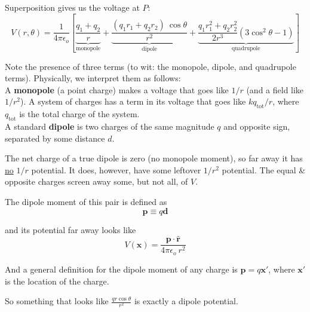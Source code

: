 \documentclass{article}
\numberwithin{equation}{section}
\newcommand{\rhat}{\mathbf{\hat{r}}}
\begin{document}
Superposition gives us the voltage at $P$:
\begin{equation*}
    V(r,\theta) = \frac{1}{4\pi\epsilon_o} \left[ \underbrace{\frac{q_1 + q_2}{r}}_{\displaystyle \text{monopole}} + \underbrace{\frac{\left( q_1 r_1 + q_2 r_2 \right)\ \cos{\theta}}{r^2}}_{\displaystyle \text{dipole}} + \underbrace{\frac{q_1 r_1^2 + q_2r_2^2}{2r^3} \left( 3\cos^2{\theta} - 1 \right)}_{\displaystyle \text{quadrupole}} \right]
\end{equation*}

Note the presence of three terms (to wit: the monopole, dipole, and quadrupole terms). Physically, we interpret them as follows: \\

A \textbf{monopole} (a point charge) makes a voltage that goes like $1/r$ (and a field like $1/r^2$). A system of charges has a term in its voltage that goes like $k q_{\text{tot}}/r$, where $q_{\text{tot}}$ is the total charge of the system. \\

A standard \textbf{dipole} is two charges of the same magnitude $q$ and opposite sign, separated by some distance $d$.

The net charge of a true dipole is zero (no monopole moment), so far away it has \underline{no} $1/r$ potential. It does, however, have some leftover $1/r^2$ potential. The equal \& opposite charges screen away some, but not all, of $V$.

The dipole moment of this pair is defined as
\begin{equation*}
    \bm{p} \equiv q \bm{d}
\end{equation*}

and its potential far away looks like
\begin{equation*}
    V(\bm{x}) = \frac{\bm{p} \cdot \rhat}{4\pi\epsilon_o\ r^2}
\end{equation*}

And a general definition for the dipole moment of any charge is $\displaystyle \bm{p} = q\bm{x'}$, where $\bm{x'}$ is the location of the charge.

So something that looks like $\displaystyle \frac{q r \cos{\theta}}{r^2}$ is exactly a dipole potential.

\begin{figure}[H]
\centering
{}
\label{fig:4:exactdipole}
\end{figure}
\end{document}
